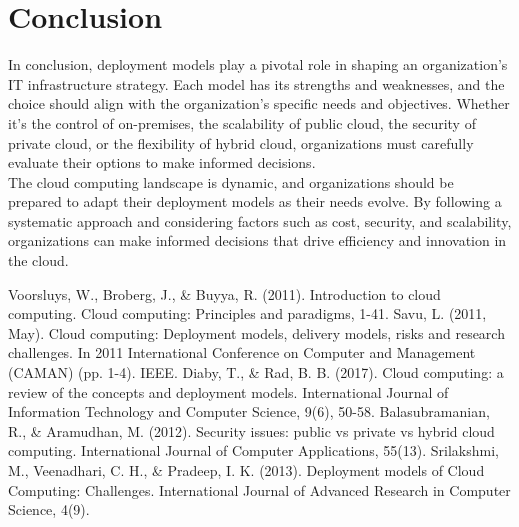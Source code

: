 \documentclass[12pt]{report}
\begin{document}
\newpage
\section*{Conclusion}
In conclusion, deployment models play a pivotal role in shaping an organization's IT infrastructure strategy. Each model has its strengths and weaknesses, and the choice should align with the organization's specific needs and objectives. Whether it's the control of on-premises, the scalability of public cloud, the security of private cloud, or the flexibility of hybrid cloud, organizations must carefully evaluate their options to make informed decisions.\\
The cloud computing landscape is dynamic, and organizations should be prepared to adapt their deployment models as their needs evolve. By following a systematic approach and considering factors such as cost, security, and scalability, organizations can make informed decisions that drive efficiency and innovation in the cloud.


\newpage
\renewcommand{\bibname}{References}
\begin{thebibliography}{}
    Voorsluys, W., Broberg, J., \& Buyya, R. (2011). Introduction to cloud computing. Cloud computing: Principles and paradigms, 1-41.
    Savu, L. (2011, May). Cloud computing: Deployment models, delivery models, risks and research challenges. In 2011 International Conference on Computer and Management (CAMAN) (pp. 1-4). IEEE.
    Diaby, T., \& Rad, B. B. (2017). Cloud computing: a review of the concepts and deployment models. International Journal of Information Technology and Computer Science, 9(6), 50-58.
    Balasubramanian, R., \& Aramudhan, M. (2012). Security issues: public vs private vs hybrid cloud computing. International Journal of Computer Applications, 55(13).
    Srilakshmi, M., Veenadhari, C. H., \& Pradeep, I. K. (2013). Deployment models of Cloud Computing: Challenges. International Journal of Advanced Research in Computer Science, 4(9).
\end{thebibliography}
\end{document}
